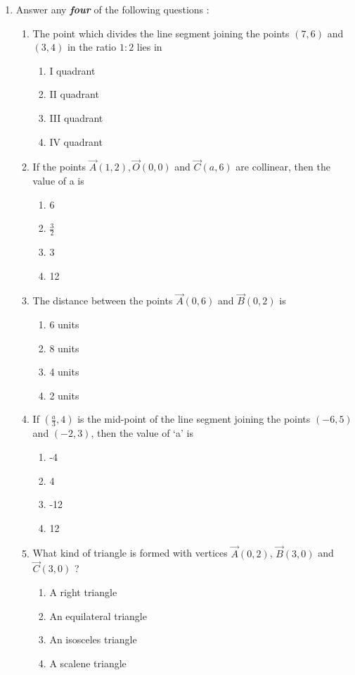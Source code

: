 \documentclass{article}
\begin{document}
\begin{enumerate}
\item Answer any \textbf{\textit{four}} of the following questions : 		
\begin{enumerate}
\item The point which divides the line segment joining the points $(7, 6)$ and $(3, 4)$ in the ratio $1 : 2$ lies in
	\begin{enumerate}
	\item I quadrant 
	\item II quadrant 
	\item III quadrant  
	\item IV quadrant
	\end{enumerate}
\item  If the points $\vec{A}(1, 2), \vec{O}(0, 0)$ and $\vec{C}(a, 6)$ are collinear, then the value of a is 
	\begin{enumerate}
	\item 6
	\item $\frac{3}{2}$
	\item 3
	\item 12
	\end{enumerate}
\item  The distance between the points $\vec{A}(0, 6)$ and $\vec{B}(0, 2)$ is 
	\begin{enumerate}
	\item 6 units
	\item 8 units
	\item 4 units
	\item 2 units
	\end{enumerate}
\item  If $(\frac{a}{3},4)$ is the mid-point of the line segment joining the points $(-6, 5)$ and $(-2, 3)$, then the value of {\lq a\rq} is
	\begin{enumerate}
	\item -4
	\item 4
	\item -12
	\item 12
	\end{enumerate}
\item  What kind of triangle is formed with vertices $\vec{A}(0, 2)$, $\vec{B}(3, 0)$ and $\vec{C}(3, 0)$ ? 
	\begin{enumerate}
	\item A right triangle 
	\item An equilateral triangle
	\item An isosceles triangle 
	\item A scalene triangle 
	\end{enumerate}
\end{enumerate}
		

\end{enumerate}
\end{document}
